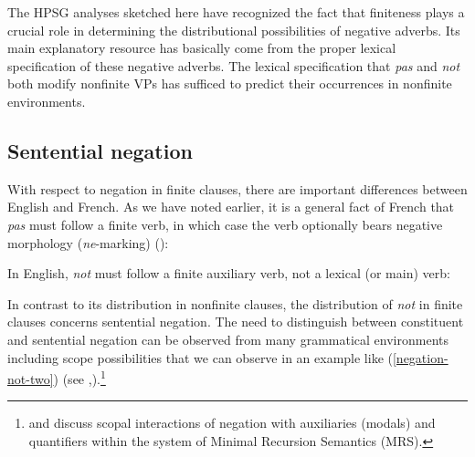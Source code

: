 \documentclass[output=paper
                ,modfonts
                ,nonflat
	        ,collection
	        ,collectionchapter
	        ,collectiontoclongg
 	        ,biblatex
                ,babelshorthands
                ,newtxmath
                ,draftmode
                ,colorlinks, citecolor=brown
]{./langsci/langscibook}
\begin{document}
{\begin{exe}
\begin{xlist}
\begin{exe}
\begin{xlist}
The HPSG analyses sketched here have recognized
the fact that finiteness plays a crucial role in
determining the distributional possibilities of negative
adverbs. Its main explanatory resource
has basically come from the proper lexical specification of these negative
adverbs. The lexical specification that \textit{pas} and
\textit{not} both modify nonfinite VPs has sufficed to predict their
occurrences in nonfinite environments.



\subsection{Sentential negation}
\label{sec-sentential-negation}

With respect to negation in finite clauses, there are important differences between English and French.
As we have noted earlier, it is a general fact of French that \textit{pas} must follow a finite verb, in which case the verb optionally bears negative morphology (\textit{ne}-marking) (\citealp[]{KS:02}):

\eal
{}
\zl
\noindent
In English, \textit{not} must follow a finite
auxiliary verb, not a lexical (or main) verb:

\eal
{}
\zl

In contrast to its distribution
in nonfinite clauses, the distribution
of \textit{not}
 in finite clauses concerns sentential
 negation.
  The need to distinguish between constituent and sentential negation can be
  observed from
  many grammatical environments including scope
possibilities that we can observe in an example like (\ref{negation-not-two}) (see \citealt{Klima:64, Baker:91, Warner2000a-u},\citealt[]{kimmichaelis:2020}).\footnote{\citet{Warner2000a-u} and \citet{BL:13}
discuss scopal interactions of negation with auxiliaries (modals) and quantifiers
within the system of Minimal Recursion Semantics (MRS).}


\end{xlist}
\end{exe}
\end{xlist}
\end{exe}}
\end{document}
